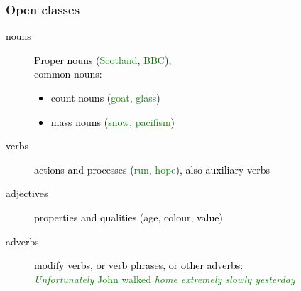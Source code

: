 \begin{frame}[fragile]\frametitle{Open classes}
  \textcolor{black}{
  \begin{description}
  \item[nouns] Proper nouns (\textcolor{green}{Scotland}, \textcolor{green}{BBC}),\\
    common nouns:
    \begin{itemize}
    \item count nouns (\textcolor{green}{goat},
      \textcolor{green}{glass})
    \item mass nouns (\textcolor{green}{snow},
      \textcolor{green}{pacifism})
    \end{itemize}
  \item[verbs] actions and processes (\textcolor{green}{run},
    \textcolor{green}{hope}), also auxiliary verbs
  \item[adjectives] properties and qualities (age, colour, value)
  \item[adverbs] modify verbs, or verb phrases, or other adverbs:\\
    \textcolor{green}{\emph{Unfortunately} John walked \emph{home
        extremely slowly yesterday}}
  \end{description}}
\end{frame}


